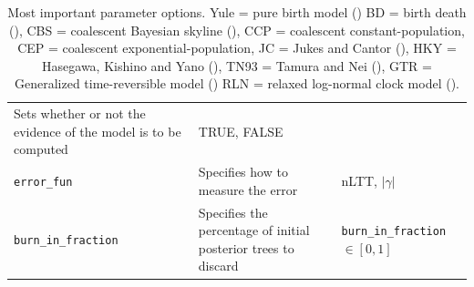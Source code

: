 \begin{table}
\begin{tabular}{|p{3.4cm}|p{9.7cm}|p{4.5cm}@{}|}
    Sets whether or not the evidence of the model is to be computed &
    TRUE, FALSE \\
    \verb;error_fun; &
    Specifies how to measure the error &
    nLTT, $|\gamma|$ \\
    \verb;burn_in_fraction; &
    Specifies the percentage of initial posterior trees to discard &
    \verb;burn_in_fraction; $\in [0, 1]$\\
    \hline
  \end{tabular}
  \caption{
    Most important parameter options.
    Yule = pure birth model (\cite{yule})
    BD = birth death (\cite{nee1994reconstructed}), 
    CBS = coalescent Bayesian skyline (\cite{drummond2005bayesian}), 
    CCP = coalescent constant-population, 
    CEP = coalescent exponential-population,
    JC = Jukes and Cantor (\cite{jukes1969evolution}), 
    HKY = Hasegawa, Kishino and Yano (\cite{hasegawa1985dating}), 
    TN93 = Tamura and Nei (\cite{tamura1993estimation}), 
    GTR = Generalized time-reversible model (\cite{tavare1986some})
    RLN = relaxed log-normal clock model (\cite{drummond2006relaxed}).
  }
  \label{tab:options}
\bigskip


\end{table}
